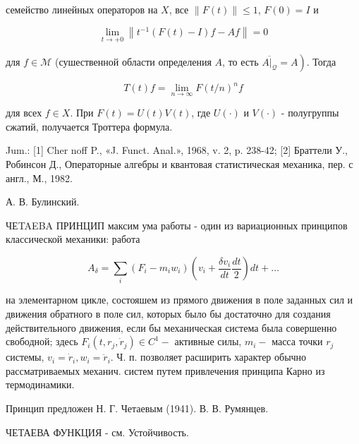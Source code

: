 \documentclass[10pt]{article}
\begin{document}
семейство линейных операторов на $X$, все $\|F(t)\| \leqslant 1$, $F(0)=I$ и



\[

\lim _{t \rightarrow+0}\left\|t^{-1}(F(t)-I) f-A f\right\|=0

\]



для $f \in \mathscr{M}$ (сушественной области определения $A$, то есть $\left.\overline{\left.A\right|_{\mathscr{Q}}}=A\right)$. Тогда



\[

T(t) f=\lim _{n \rightarrow \infty} F(t / n)^{n} f

\]



для всех $f \in X$. При $F(t)=U(t) V(t)$, где $U(\cdot)$ и $V(\cdot)$ - полугруппы сжатий, получается Троттера формула.



Jum.: [1] Cher noff P., «J. Funct. Anal.», 1968, v. 2, p. 238-42; [2] Браттели У., Робинсон Д., Операторные алгебры и квантовая статистическая механика, пер. с англ., М., 1982.



А. В. Булинский.



ЧЕTAEBA ПРИНЦИП максим ума работы - один из вариационных принципов классической механики: работа



\[

A_{\delta}=\sum_{i}\left(F_{i}-m_{i} w_{i}\right)\left(v_{i}+\frac{\delta v_{i}}{d t} \frac{d t}{2}\right) d t+\ldots

\]



на элементарном цикле, состояшем из прямого движения в поле заданных сил и движения обратного в поле сил, которых было бы достаточно для создания действительного движения, если бы механическая система была совершенно свободной; здесь $F_{i}\left(t, r_{j}, \dot{r}_{j}\right) \in C^{1}-$ активные силы, $m_{i}-$ масса точки $r_{j}$ системы, $v_{i}=\dot{r}_{i}, w_{i}=\ddot{r}_{i}$. Ч. п. позволяет расширить характер обычно рассматриваемых механич. систем путем привлечения принципа Карно из термодинамики.



Принцип предложен Н. Г. Четаевым (1941). В. В. Румянцев.



ЧЕТАЕВА ФУНКЦИЯ - см. Устойчивость.
\end{document}
